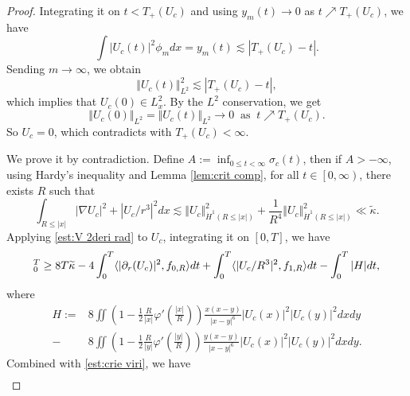 \documentclass[reqno, 11pt]{amsart}
\numberwithin{equation}{section}
\theoremstyle{plain}
\theoremstyle{definition}
\numberwithin{equation}{section}
\numberwithin{theorem}{section}
\numberwithin{equation}{section}
\numberwithin{equation}{section}
\numberwithin{theorem}{section}
\begin{document}
\begin{proof}
		Integrating it on $t<T_+(U_c)$ and using $y_m(t)\rightarrow0$ as $t\nearrow T_+(U_c)$, we have
		\begin{equation*}
		\int |U_c(t)|^2 \phi_mdx=y_m(t)\lesssim|T_+(U_c)-t|.
		\end{equation*}
		Sending $m\to \infty$, we obtain
		\begin{equation*}
		\Vert U_c(t) \Vert_{L^2}^2 \lesssim |T_+(U_c)-t|,
		\end{equation*}
		which implies that $U_c(0)\in L_{x}^2$. By the $L^2$ conservation, we get
		\begin{equation*}
		\Vert U_c(0) \Vert_{L^2}=\Vert U_c(t) \Vert_{L^2}\to 0\;\;\text{as}\;\;t\nearrow T_+(U_c).
		\end{equation*}
		So $U_c=0$, which contradicts with $T_+(U_c)<\infty$.
		
		 We prove it by contradiction. Define $A:=\inf_{0\leq t<\infty}\sigma_{c}(t)$, then if $A>-\infty$, using Hardy's inequality and Lemma \ref{lem:crit comp}, for all $t\in \left[0,\infty \right)$, there exists $R$ such that 
		\begin{equation}\label{est:crie viri}
		\int_{R\leq|x|}|\nabla U_c|^2 + | U_c/r^3|^2dx\lesssim \Vert U_c\Vert_{\dot H^1(R\leq|x|)}^2+\frac{1}{R^4}\Vert U_c\Vert_{\dot H^1(R\leq|x|)}^2   \ll \widetilde{\kappa}.
		\end{equation}
		Applying \eqref{est:V 2deri rad} to $U_c$, integrating it on $[0,T]$, we have
		\begin{equation*}
		[\dot{V}_R(t)]_0^T\geq 8T\widetilde{\kappa}-4\int_{0}^{T} \langle|\partial_{r}(U_c)|^2,f_{0,R}\rangle dt+\int_{0}^{T} \langle|U_c/R^{3}|^2,f_{1,R}\rangle dt \\-  \int_{0}^{T} |H|dt,
		\end{equation*}
		where
		\begin{equation*}
		\begin{aligned}
		H:=&8\iint \left( 1-\frac{1}{2}\frac{R}{|x|} \varphi' \left( \frac{|x|}{R} \right) \right) \frac{x(x-y)}{|x-y|^6} |U_c(x)|^2|U_c(y)|^2 dxdy\\-&8\iint \left( 1-\frac{1}{2}\frac{R}{|y|} \varphi' \left( \frac{|y|}{R} \right) \right) \frac{y(x-y)}{|x-y|^6} |U_c(x)|^2|U_c(y)|^2 dxdy.
		\end{aligned}
		\end{equation*}
		Combined with \eqref{est:crie viri}, we have
		\begin{equation*}
		\begin{aligned}

\end{aligned}
\end{equation*}
\end{proof}
\end{document}

